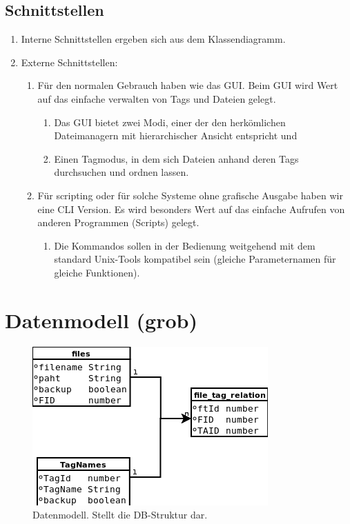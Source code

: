 \documentclass[10pt,paper=a4,final]{scrartcl}
\begin{document}
\subsection{Schnittstellen}
\begin{enumerate}
  \item Interne Schnittstellen ergeben sich aus dem Klassendiagramm.
  \item Externe Schnittstellen:
    \begin{enumerate}
      \item Für den normalen Gebrauch haben wie das GUI. Beim GUI wird Wert auf das einfache verwalten von Tags und Dateien gelegt.
	\begin{enumerate}
	  \item Das GUI bietet zwei Modi, einer der den herkömlichen Dateimanagern mit hierarchischer Ansicht entspricht und
	  \item Einen Tagmodus, in dem sich Dateien anhand deren Tags durchsuchen und ordnen lassen.
	\end{enumerate}
      \item Für scripting oder für solche Systeme ohne grafische Ausgabe haben wir eine CLI Version. Es wird besonders Wert auf das einfache Aufrufen von anderen Programmen (Scripts) gelegt.
	\begin{enumerate}
	  \item Die Kommandos sollen in der Bedienung weitgehend mit dem standard Unix-Tools kompatibel sein (gleiche Parameternamen für gleiche Funktionen).
	\end{enumerate}
    \end{enumerate}
\end{enumerate}
\section{Datenmodell (grob)}
\begin{figure}[h!]
    \includegraphics[scale=1.0]{diag2.png}
   \caption{Datenmodell. Stellt die DB-Struktur dar.}
\end{figure}
\end{document}
